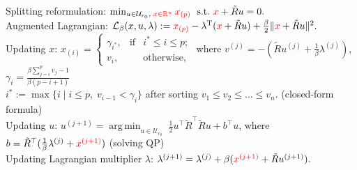 \documentclass[a0paper,portrait]{baposter}
\DeclareMathOperator*{\argmin}{arg\,min}
\newcommand{\zz}{^{\mathrm{T}}}
\newcommand{\R}{\mathbb{R}}
\newcommand{\st}{\;\mathrm{s.t.}\;}
\newcommand{\Lb}{\mathcal{L}_{\beta}}
\begin{document}
\begin{poster}
{{\color{blue} Splitting reformulation:}
$\min_{ u \in \mathcal{U}_{r_0},  \; {\color{red}x \in \R^n}}
{\color{red}x_{(p)}} \quad ~\st~ {\color{red}x} + \tilde{R}u = 0.$\\[1mm]
%
{\color{blue} Augmented Lagrangian:}
$\Lb(x,u,\lambda):= {\color{red}x_{(p)}} - \lambda\zz ({\color{red}x}
+ \tilde{R} u) + \frac{\beta}{2} \| {\color{red}x} + \tilde{R} u
\|^2.$\\[1mm]
%
{\color{blue} Updating $x$:}  $x_{(i)} = \left\{\begin{array}{ccc} \gamma_{i^*}, &\mbox{if}&
 i^* \leq i\leq p;\\ v_i, && \mbox{otherwise},
\end{array}\right.$ where $v^{(j)} = - \left(\tilde{R} u^{(j)} + \frac{1}{\beta}
\lambda^{(j)} \right)$,  $\gamma_i = \frac{ \beta \sum_{j=i}^p v_j - 1}{ \beta (p-i+1) }$ \\
\indent\qquad\qquad\qquad $i^*:= \max \{ i \mid i\le p, \; v_{i-1} < \gamma_i  \}$ after sorting $ v_1 \le v_2 \le \ldots \le v_n$. (closed-form formula)\\[1mm]
%
{\color{blue} Updating $u$:} $ u^{(j+1)}  =   \argmin_{ u \in \mathcal{U}_{r_0}} \;
 \frac{1}{2} u^\top \tilde{R}^\top \tilde{R} u + b^\top u$, where $b=\tilde{R}^\top (\frac{1}{\beta} \lambda^{(j)}  +
{\color{red}x^{(j+1)}})$ (solving QP)\\[1mm]
%
{\color{blue} Updating Lagrangian multiplier $\lambda$:} $\lambda^{(j+1)} =  \lambda^{(j)} + \beta ({\color{red}x^{(j+1)}}+
\tilde{R} u^{(j+1)}).$
}


\end{poster}
\end{document}
